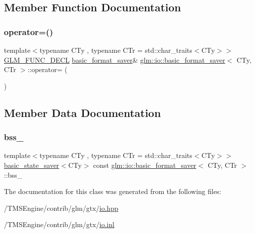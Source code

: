 \subsection{Member Function Documentation}
\mbox{\label{classglm_1_1io_1_1basic__format__saver_a3d4f0a9fd357a611f81b17443cf5276b}} 
\subsubsection{\texorpdfstring{operator=()}{operator=()}}
{\footnotesize\ttfamily template$<$typename C\+Ty , typename C\+Tr  = std\+::char\+\_\+traits$<$\+C\+Ty$>$$>$ \\
\hyperlink{setup_8hpp_ab2d052de21a70539923e9bcbf6e83a51}{G\+L\+M\+\_\+\+F\+U\+N\+C\+\_\+\+D\+E\+CL} \hyperlink{classglm_1_1io_1_1basic__format__saver}{basic\+\_\+format\+\_\+saver}\& \hyperlink{classglm_1_1io_1_1basic__format__saver}{glm\+::io\+::basic\+\_\+format\+\_\+saver}$<$ C\+Ty, C\+Tr $>$\+::operator= (\begin{DoxyParamCaption}\item[{\hyperlink{classglm_1_1io_1_1basic__format__saver}{basic\+\_\+format\+\_\+saver}$<$ C\+Ty, C\+Tr $>$ const \&}]{ }\end{DoxyParamCaption})\hspace{0.3cm}{\ttfamily [private]}}



\subsection{Member Data Documentation}
\mbox{\label{classglm_1_1io_1_1basic__format__saver_a5d2b333a0879f294698c266fa4a7792b}} 
\subsubsection{\texorpdfstring{bss\+\_\+}{bss\_}}
{\footnotesize\ttfamily template$<$typename C\+Ty , typename C\+Tr  = std\+::char\+\_\+traits$<$\+C\+Ty$>$$>$ \\
\hyperlink{classglm_1_1io_1_1basic__state__saver}{basic\+\_\+state\+\_\+saver}$<$C\+Ty$>$ const \hyperlink{classglm_1_1io_1_1basic__format__saver}{glm\+::io\+::basic\+\_\+format\+\_\+saver}$<$ C\+Ty, C\+Tr $>$\+::bss\+\_\+\hspace{0.3cm}{\ttfamily [private]}}



The documentation for this class was generated from the following files\+:\begin{DoxyCompactItemize}
\item 
/\+T\+M\+S\+Engine/contrib/glm/gtx/\hyperlink{io_8hpp}{io.\+hpp}\item 
/\+T\+M\+S\+Engine/contrib/glm/gtx/\hyperlink{io_8inl}{io.\+inl}\end{DoxyCompactItemize}
